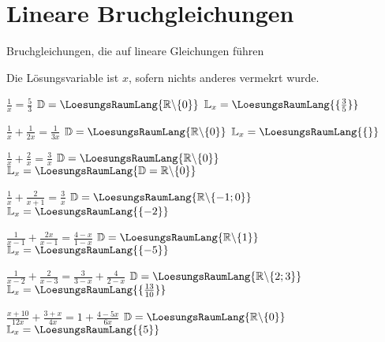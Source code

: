

\renewcommand{\bbwAufgabenBlockID}{GL\_Br}



\usepackage{amssymb} %
\renewcommand{\metaHeaderLine}{Arbeitsblatt}
\renewcommand{\arbeitsblattTitel}{Bruchgleichungen}

\arbeitsblattHeader{}

\section{Lineare Bruchgleichungen}
Bruchgleichungen, die auf lineare Gleichungen führen

Die Lösungsvariable ist $x$, sofern nichts anderes vermekrt wurde.


\begin{bbwAufgabenBlock}
\item $\frac1x = \frac53$     \hspace{10mm}              $\mathbb{D}= \LoesungsRaumLang{\mathbb{R}\backslash\{0\}}$    $\mathbb{L}_x = \LoesungsRaumLang{\{\frac35\}}$
\item $\frac1x + \frac1{2x} = \frac1{3x}$ \hspace{10mm}   $\mathbb{D}= \LoesungsRaumLang{\mathbb{R}\backslash\{0\}}$    $\mathbb{L}_x = \LoesungsRaumLang{\{\}}$
\item $\frac1x + \frac2x = \frac3x$  \hspace{10mm}       $\mathbb{D}= \LoesungsRaumLang{\mathbb{R}\backslash\{0\}}$    $\mathbb{L}_x = \LoesungsRaumLang{\mathbb{D}=\mathbb{R}\backslash\{0\}}$
\item $\frac1x + \frac2{x+1} = \frac3x$ \hspace{10mm}    $\mathbb{D}= \LoesungsRaumLang{\mathbb{R}\backslash\{-1;0\}}$ $\mathbb{L}_x = \LoesungsRaumLang{\{-2\}}$
\item $\frac1{x-1} + \frac{2x}{x-1} = \frac{4-x}{1-x}$ \hspace{10mm}    $\mathbb{D}= \LoesungsRaumLang{\mathbb{R}\backslash\{1\}}$ $\mathbb{L}_x = \LoesungsRaumLang{\{-5\}}$
\item $\frac1{x-2} + \frac{2}{x-3} = \frac3{3-x} + \frac{4}{2-x}$ \hspace{10mm}    $\mathbb{D}= \LoesungsRaumLang{\mathbb{R}\backslash\{2;3\}}$ $\mathbb{L}_x = \LoesungsRaumLang{\{\frac{13}{10}\}}$
\item $\frac{x+10}{12x} + \frac{3+x}{4x} = 1 + \frac{4-5x}{6x}$ \hspace{10mm}    $\mathbb{D}= \LoesungsRaumLang{\mathbb{R}\backslash\{0\}}$ $\mathbb{L}_x = \LoesungsRaumLang{\{5\}}$
\end{bbwAufgabenBlock}

